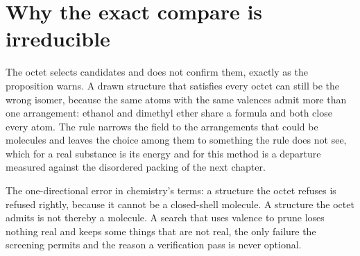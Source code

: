\section{Why the exact compare is irreducible}

The octet selects candidates and does not confirm them, exactly as the proposition warns. A drawn
structure that satisfies every octet can still be the wrong isomer, because the same atoms with the
same valences admit more than one arrangement: ethanol and dimethyl ether share a formula and both
close every atom. The rule narrows the field to the arrangements that could be molecules and leaves
the choice among them to something the rule does not see, which for a real substance is its energy
and for this method is a departure measured against the disordered packing of the next chapter.

The one-directional error in chemistry's terms: a structure the octet refuses is refused rightly,
because it cannot be a closed-shell molecule. A structure the octet admits is not thereby a
molecule. A search that uses valence to prune loses nothing real and keeps some things that are not
real, the only failure the screening permits and the reason a verification pass is never optional.
